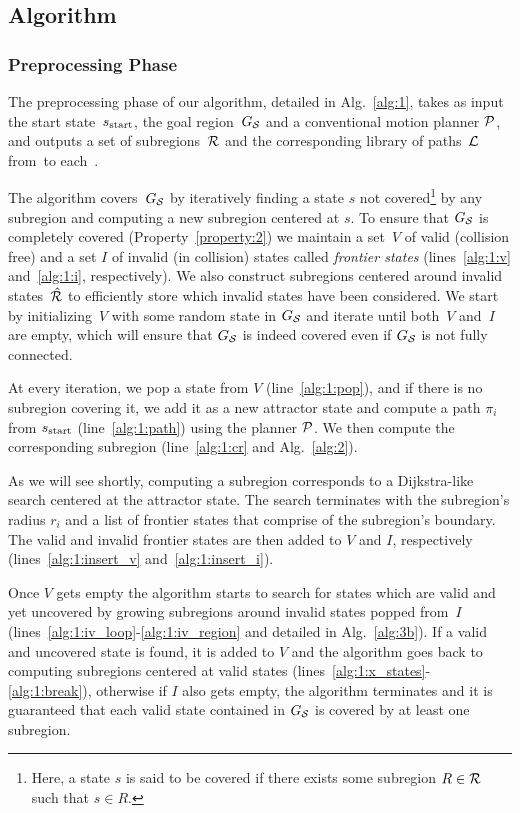\documentclass[a4paper,10pt]{article}
\begin{document}
\subsection {Algorithm}
\label{subsec:alg}
\subsubsection{Preprocessing Phase}
The preprocessing phase of our algorithm, detailed in Alg.~\ref{alg:1}, takes as input the start state~$s_{\textrm{start}}$, the goal region~$G_\mathcal{S}$ and a conventional motion planner $\mathcal{P}$, and outputs a set of subregions~$\mathcal{R}$ and the corresponding library of paths~$\mathcal{L}$ from~\Sstart to each~\sAttract. 

The algorithm covers~$G_\mathcal{S}$ by iteratively finding a state $s$ not covered\footnote{Here, a state $s$ is said to be covered if there exists some subregion $R \in \mathcal{R}$ such that $s \in R$.} by any subregion and computing a new subregion centered at $s$.
To ensure that $G_\mathcal{S}$ is completely covered (Property~\ref{property:2}) we maintain a set~$V$ of valid (collision free) and a set $I$ of invalid (in collision) states called \emph{frontier states} (lines~\ref{alg:1:v} and~\ref{alg:1:i}, respectively).
We also construct subregions centered around invalid states~$\hat{\mathcal{R}}$ to efficiently store which invalid states have been considered.
We start by initializing~$V$ with some random state in $G_\mathcal{S}$ and iterate until both~$V$ and~$I$ are empty, which will ensure that $G_\mathcal{S}$ is indeed covered even if $G_\mathcal{S}$ is not fully connected.

At every iteration, we pop a state from $V$ (line~\ref{alg:1:pop}), and if there is no subregion covering it, we add it as a new attractor state and compute a path $\pi_i$ from $s_{\textrm{start}}$ (line~\ref{alg:1:path}) using the planner $\mathcal{P}$.
We then compute the corresponding subregion (line~\ref{alg:1:cr} and Alg.~\ref{alg:2}).

As we will see shortly, computing a subregion corresponds to a Dijkstra-like search centered at the attractor state.
The search terminates with the subregion's radius $r_i$ and a list of frontier states that comprise of the subregion's boundary.
The valid and invalid frontier states are then added to $V$ and $I$, respectively (lines~\ref{alg:1:insert_v} and~\ref{alg:1:insert_i}).


Once $V$ gets empty the algorithm starts to search for states which are valid and yet uncovered by growing subregions around invalid states popped from~$I$ (lines~\ref{alg:1:iv_loop}-\ref{alg:1:iv_region} and detailed in Alg.~\ref{alg:3b}). If a valid and uncovered state is found, it is added to $V$ and the algorithm goes back to computing subregions centered at valid states (lines~\ref{alg:1:x_states}-\ref{alg:1:break}), otherwise if $I$ also gets empty, the algorithm terminates and it is guaranteed that each valid state contained in $G_\mathcal{S}$ is covered by at least one subregion.
\end{document}

